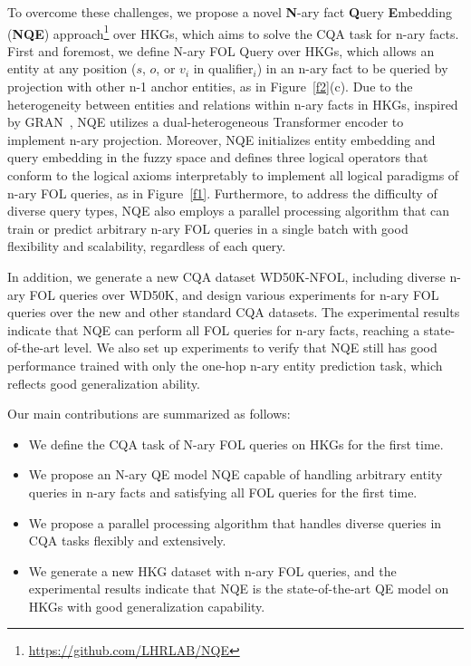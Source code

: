 \documentclass[letterpaper]{article} \usepackage{aaai23}  \usepackage{times}  \usepackage{helvet}  \usepackage{courier}  \usepackage[hyphens]{url}  \usepackage{graphicx} \urlstyle{rm} \def\UrlFont{\rm}  \usepackage{natbib}  \usepackage{caption} \frenchspacing  \setlength{\pdfpagewidth}{8.5in}  \setlength{\pdfpageheight}{11in}  \usepackage{algorithm}
\begin{document}
To overcome these challenges, we propose a novel \textbf{N}-ary fact \textbf{Q}uery \textbf{E}mbedding (\textbf{NQE}) approach\footnote{\url{https://github.com/LHRLAB/NQE}} over HKGs, which aims to solve the CQA task for n-ary facts. First and foremost, we define N-ary FOL Query over HKGs, which allows an entity at any position ($s$, $o$, or $v_i$ in qualifier$_i$) in an n-ary fact to be queried by projection with other n-1 anchor entities, as in Figure~\ref{f2}(c). Due to the heterogeneity between entities and relations within n-ary facts in HKGs, inspired by GRAN~\citep{HAN,RPRT,GRAN}, NQE utilizes a dual-heterogeneous Transformer encoder to implement n-ary projection. Moreover, NQE initializes entity embedding and query embedding in the fuzzy space and defines three logical operators that conform to the logical axioms interpretably to implement all logical paradigms of n-ary FOL queries, as in Figure~\ref{f1}. Furthermore, to address the difficulty of diverse query types, NQE also employs a parallel processing algorithm that can train or predict arbitrary n-ary FOL queries in a single batch with good flexibility and scalability, regardless of each query.

In addition, we generate a new CQA dataset WD50K-NFOL, including diverse n-ary FOL queries over WD50K, and design various experiments for n-ary FOL queries over the new and other standard CQA datasets. The experimental results indicate that NQE can perform all FOL queries for n-ary facts, reaching a state-of-the-art level. We also set up experiments to verify that NQE still has good performance trained with only the one-hop n-ary entity prediction task, which reflects good generalization ability. 

Our main contributions are summarized as follows:

\begin{itemize}
\item We define the CQA task of N-ary FOL queries on HKGs for the first time.
\item We propose an N-ary QE model NQE capable of handling arbitrary entity queries in n-ary facts and satisfying all FOL queries for the first time. 
\item We propose a parallel processing algorithm that handles diverse queries in CQA tasks flexibly and extensively.
\item We generate a new HKG dataset with n-ary FOL queries, and the experimental results indicate that NQE is the state-of-the-art QE model on HKGs with good generalization capability.
\end{itemize}
\end{document}
